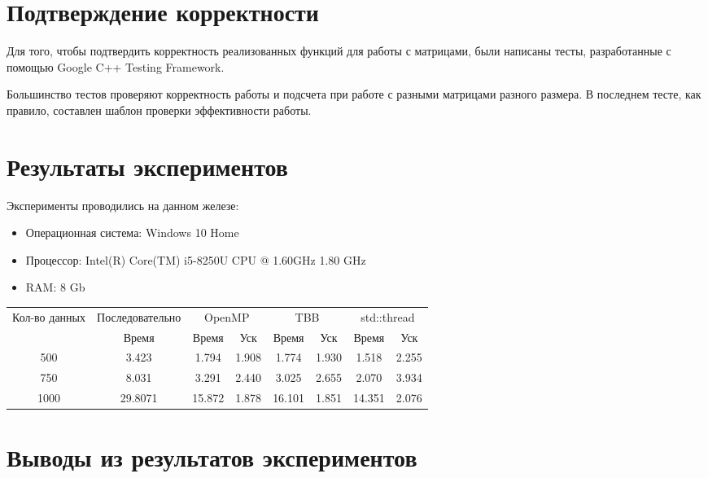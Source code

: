\documentclass{report}
\begin{document}
\section*{Подтверждение корректности}
Для того, чтобы подтвердить корректность реализованных функций для работы с матрицами, были написаны тесты, разработанные с помощью Google C++ Testing Framework.

Большинство тестов проверяют корректность работы и подсчета при работе с разными матрицами разного размера. В последнем тесте, как правило, составлен шаблон проверки эффективности работы.

\newpage

\section*{Результаты экспериментов}
Эксперименты проводились на данном железе:
\begin{itemize}
\item Операционная система: Windows 10 Home
\item Процессор: Intel(R) Core(TM) i5-8250U CPU @ 1.60GHz   1.80 GHz
\item RAM: 8 Gb
\end{itemize}
\vspace{3em}
\begin{tabular}{ |c|c|c|c|c|c|c|c|}
\hline
\multirow{2}{*}{Кол-во данных} & Последовательно & \multicolumn{2}{c|}{OpenMP} & \multicolumn{2}{c|}{TBB} & \multicolumn{2}{c|}{std::thread} \\ \cline{2-8} 
     & Время & Время & Уск & Время & Уск & Время & Уск \\ \hline
500  &  3.423 & 1.794 & 1.908 & 1.774 &1.930 & 1.518 & 2.255   \\
750 & 8.031 & 3.291 & 2.440 & 3.025 & 2.655 & 2.070 & 3.934 \\
1000 & 29.8071 & 15.872 & 1.878 & 16.101 & 1.851 & 14.351 & 2.076 \\
\hline
\end{tabular}

\newpage

\section*{Выводы из результатов экспериментов}
\end{document}
